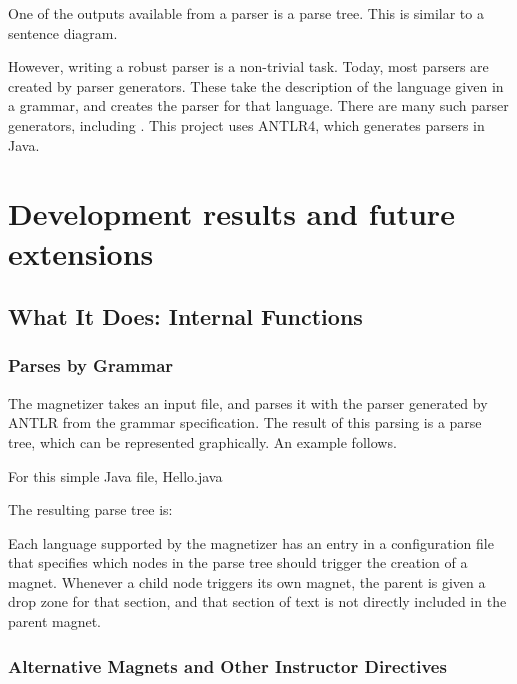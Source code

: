 \documentclass[letter,10pt]{article}
\begin{document}
One of the outputs available from a parser is a parse tree. This is 
similar to a sentence diagram. 

However, writing a robust parser is a non-trivial task. Today, most 
parsers are created by parser generators. These take the description of 
the language given in a grammar, and creates the parser for that 
language. There are many such parser generators, including . This project uses ANTLR4, which generates 
parsers in Java.  

\section{Development results and future extensions}

\subsection{What It Does: Internal Functions}

\subsubsection{Parses by Grammar}

The magnetizer  takes an input 
file, and parses it with the parser generated by ANTLR from the grammar 
specification. The result of this parsing is a parse tree, which can 
be represented graphically. An example follows.

For this simple Java file, Hello.java

The resulting parse tree is:

\label{fig:parseTree}

Each language supported by the magnetizer has an entry in a 
configuration file that specifies which nodes in the parse tree should 
trigger the creation of a magnet. Whenever a child node triggers its 
own magnet, the parent is given a drop zone for that section, and that 
section of text is not directly included in the parent magnet.




\subsubsection{Alternative Magnets and Other Instructor Directives}
\end{document}
